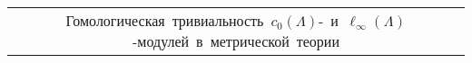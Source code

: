 \begin{scriptsize}
\begin{longtable}{|c|c|c|c|c|c|c|} 
\multicolumn{7}{c}{\mbox{Гомологическая тривиальность $c_0(\Lambda)$- и $\ell_\infty(\Lambda)$-модулей в метрической теории}}                                                                                                                                                                                                                                                                                                                                                                                                                                                                                                                                                                                                                            \\
				 

\end{longtable}
\end{scriptsize}
